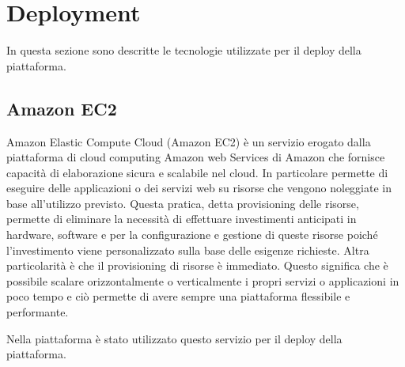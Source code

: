 \section{Deployment}
In questa sezione sono descritte le tecnologie utilizzate per il deploy della piattaforma.

\subsection{Amazon EC2}
Amazon Elastic Compute Cloud (Amazon EC2) è un servizio erogato dalla piattaforma di cloud computing Amazon web Services di Amazon che
fornisce capacità di elaborazione sicura e scalabile nel cloud. In particolare permette di eseguire delle applicazioni
o dei servizi web su risorse che vengono noleggiate in base all'utilizzo previsto. Questa pratica, detta provisioning delle risorse,
permette di eliminare la necessità di effettuare investimenti anticipati in hardware, software e per la configurazione
e gestione di queste risorse poiché l'investimento viene personalizzato sulla base delle esigenze richieste.
Altra particolarità è che il provisioning di risorse è immediato. Questo significa che è possibile scalare orizzontalmente o verticalmente
i propri servizi o applicazioni in poco tempo e ciò permette di avere sempre una piattaforma flessibile e performante.

Nella piattaforma è stato utilizzato questo servizio per il deploy della piattaforma.
